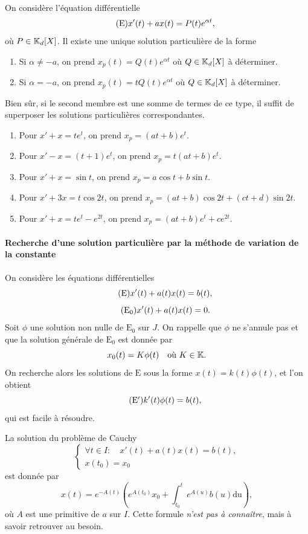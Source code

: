 \documentclass{book}
\begin{document}
On considère l'équation différentielle
\[\tag{$\mathrm{E}$} x'(t) + ax(t) = P(t) e^{\alpha t},\]
où $P\in \mathbb{K}_d[X]$.
Il existe une unique solution particulière de la forme
\begin{enumerate}
\item Si $\alpha\neq -a$, on prend $x_p(t) = Q(t) e^{\alpha t}$
  où $Q\in \mathbb{K}     _d[X]$ à déterminer.
\item Si $\alpha= -a$, on prend $x_p(t) = tQ(t) e^{\alpha t}$
  où $Q\in \mathbb{K}     _d[X]$ à déterminer.
\end{enumerate}
Bien sûr, si le second membre est une somme de termes de ce type,
il suffit de superposer les solutions particulières correspondantes.
\begin{Exemple}
\begin{enumerate}
\item Pour $x' + x = te^t$, on prend $x_p = (at+b)e^t$.
\item Pour $x' - x = (t+1)e^t$, on prend $x_p = t(at+b)e^t$.
\item Pour $x' + x = \sin t$, on prend $x_p = a\cos t + b\sin t$.
\item Pour $x' + 3x = t\cos 2t$, on prend $x_p = (at+b)\cos 2t + (ct+d)\sin 2t$.
\item Pour $x' + x = te^t - e^{2t}$, on prend $x_p = (at+b)e^t + ce^{2t}$.
\end{enumerate}
\end{Exemple}
\paragraph{Recherche d'une solution particulière  par la méthode de variation de la constante}
On considère les équations différentielles
\[\tag{$\mathrm{E}$}   x'(t) + a(t) x(t) = b(t),\]
\[\tag{$\mathrm{E_0}$} x'(t) + a(t) x(t) = 0.\]
Soit $\phi  $ une solution non nulle de $\mathrm{E_0}$ sur $J$.
On rappelle que $\phi  $ ne s'annule pas et que
la solution générale de $\mathrm{E_0}$ est donnée par
\[x_0(t) = K\phi  (t) \quad \text{où } K\in \mathbb{K}     .\]
On recherche alors les solutions de $\mathrm{E}$ sous la forme
$x(t) =k(t)\phi  (t)$, et l'on obtient
\[\tag{$\mathrm{E'}$}k'(t)\phi  (t) = b(t),\]
qui est facile à résoudre.

\begin{Corollaire}
La solution du problème de Cauchy
\[\begin{cases}
    \forall t\in I:\quad x'(t) + a(t)x(t) = b(t), \\
    x(t_0) = x_0
\end{cases}\]
est donnée par
\[x(t) = e^{-A(t)} \left( e^{A(t_0)} x_0 + \int_{t_0}^{t} e^{A(u)}b(u) \mathrm{du} \right),\]
où $A$ est une primitive de $a$ sur $I$.
Cette formule \emph{n'est pas à connaître}, mais à savoir retrouver au besoin.
\end{Corollaire}
\end{document}
